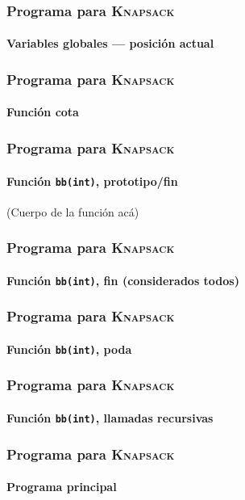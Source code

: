 \documentclass[english, spanish, fleqn,%
hyperref = {colorlinks, urlcolor = blue}%
]{beamer}
\begin{document}
\begin{frame}
  \setcounter{beamerpauses}{2}
  \frametitle{Programa para \textsc{Knapsack}}
  \framesubtitle{Variables globales --- posición actual}

  \small
  
\end{frame}

\begin{frame}
  \setcounter{beamerpauses}{2}
  \frametitle{Programa para \textsc{Knapsack}}
  \framesubtitle{Función cota}

  \small
  
\end{frame}

\begin{frame}
  \setcounter{beamerpauses}{2}
  \frametitle{Programa para \textsc{Knapsack}}
  \framesubtitle{Función \lstinline!bb(int)!, prototipo/fin}

  \small
  
  \hspace{4em}(Cuerpo de la función acá)
  
\end{frame}

\begin{frame}
  \setcounter{beamerpauses}{2}
  \frametitle{Programa para \textsc{Knapsack}}
  \framesubtitle{Función \lstinline!bb(int)!, fin (considerados todos)}

  \small
  
\end{frame}

\begin{frame}
  \setcounter{beamerpauses}{2}
  \frametitle{Programa para \textsc{Knapsack}}
  \framesubtitle{Función \lstinline!bb(int)!, poda}

  \small
  
\end{frame}

\begin{frame}
  \setcounter{beamerpauses}{2}
  \frametitle{Programa para \textsc{Knapsack}}
  \framesubtitle{Función \lstinline!bb(int)!, llamadas recursivas}

  \small
  
\end{frame}

\begin{frame}
  \setcounter{beamerpauses}{2}
  \frametitle{Programa para \textsc{Knapsack}}
  \framesubtitle{Programa principal}

  \small
  
\end{frame}
\end{document}
